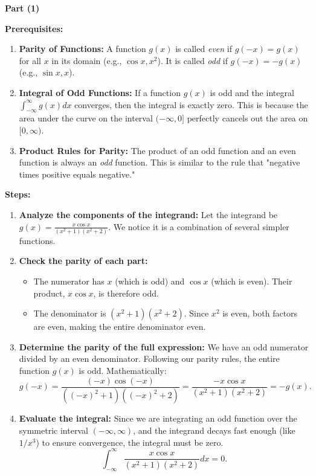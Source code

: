 \begin{solution}
\textbf{Part (1)}

\textbf{Prerequisites:}
\begin{enumerate}
    \item \textbf{Parity of Functions:} A function $g(x)$ is called \textit{even} if $g(-x) = g(x)$ for all $x$ in its domain (e.g., $\cos x, x^2$). It is called \textit{odd} if $g(-x) = -g(x)$ (e.g., $\sin x, x$).
    \item \textbf{Integral of Odd Functions:} If a function $g(x)$ is odd and the integral $\int_{-\infty}^{\infty} g(x) dx$ converges, then the integral is exactly zero. This is because the area under the curve on the interval $(-\infty, 0]$ perfectly cancels out the area on $[0, \infty)$.
    \item \textbf{Product Rules for Parity:} The product of an odd function and an even function is always an \textit{odd} function. This is similar to the rule that "negative times positive equals negative."
\end{enumerate}

\textbf{Steps:}
\begin{enumerate}
    \item \textbf{Analyze the components of the integrand:} Let the integrand be $g(x) = \frac{x \cos x}{(x^2+1)(x^2+2)}$. We notice it is a combination of several simpler functions.
    \item \textbf{Check the parity of each part:} 
        \begin{itemize}
            \item The numerator has $x$ (which is odd) and $\cos x$ (which is even). Their product, $x \cos x$, is therefore odd.
            \item The denominator is $(x^2+1)(x^2+2)$. Since $x^2$ is even, both factors are even, making the entire denominator even.
        \end{itemize}
    \item \textbf{Determine the parity of the full expression:} We have an odd numerator divided by an even denominator. Following our parity rules, the entire function $g(x)$ is odd. Mathematically:
        \[ g(-x) = \frac{(-x) \cos(-x)}{((-x)^2+1)((-x)^2+2)} = \frac{-x \cos x}{(x^2+1)(x^2+2)} = -g(x). \]
    \item \textbf{Evaluate the integral:} Since we are integrating an odd function over the symmetric interval $(-\infty, \infty)$, and the integrand decays fast enough (like $1/x^3$) to ensure convergence, the integral must be zero.
        \[ \int_{-\infty}^{\infty} \frac{x \cos x}{(x^2+1)(x^2+2)} dx = 0. \]
\end{enumerate}



\end{solution}
